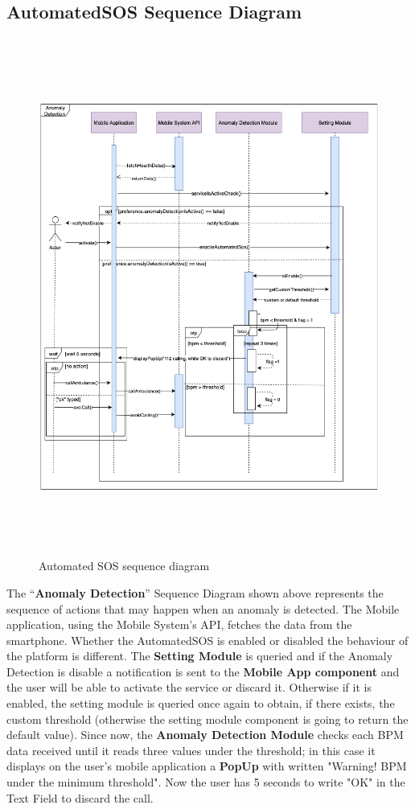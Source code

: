 \documentclass[DD.tex]{subfiles}
\begin{document}
\newpage
\subsection{AutomatedSOS Sequence Diagram}
\begin{figure}[h!]
\centering
\includegraphics[height=17.00cm,keepaspectratio]{Figures/AutomatedSOS}
\caption{Automated SOS sequence diagram}
\end{figure}

The “\textbf{Anomaly Detection}” Sequence Diagram shown above represents the sequence of actions that may happen when an anomaly is detected.
The Mobile application, using the Mobile System's API, fetches the data from the smartphone.
Whether the AutomatedSOS is enabled or disabled the behaviour of the platform is different.
The \textbf{Setting Module} is queried and if the Anomaly Detection is disable a notification is sent to the \textbf{Mobile App component} and the user will be able to activate the service or discard it.
Otherwise if it is enabled, the setting module is queried once again to obtain, if there exists, the custom threshold (otherwise the setting module component is going to return the default value).
Since now, the \textbf{Anomaly Detection Module} checks each BPM data received until it reads three values under the threshold; in this case it displays on the user's mobile application a \textbf{PopUp} with written "Warning! BPM under the minimum threshold".
Now the user has 5 seconds to write "OK" in the Text Field to discard the call.
\newpage
\end{document}
